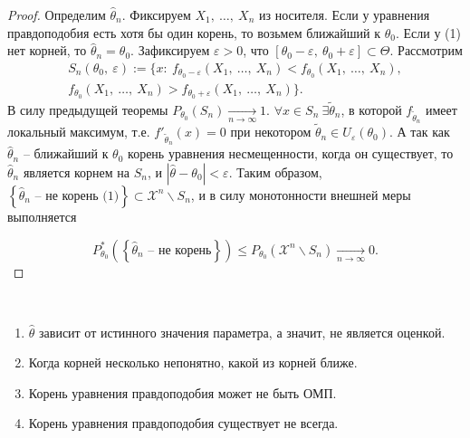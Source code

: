 \begin{proof}
    Определим $\displaystyle \hat{\theta }_{n}$. Фиксируем $\displaystyle X_{1} ,\ \dotsc ,\ X_{n}$ из носителя. Если у уравнения правдоподобия есть хотя бы один корень, то возьмем ближайший к $\displaystyle \theta _{0}$. Если у (1) нет корней, то $\displaystyle \hat{\theta }_{n} =\theta _{0}$. Зафиксируем $\displaystyle \varepsilon  >0$, что $\displaystyle [ \theta _{0} -\varepsilon ,\ \theta _{0} +\varepsilon ] \subset \Theta $. Рассмотрим
    \begin{gather*}
        S_{n}( \theta _{0} ,\ \varepsilon ) :=\{x:\ f_{\theta _{0} -\varepsilon }( X_{1} ,\ \dotsc ,\ X_{n}) < f_{\theta _{0}}( X_{1} ,\ \dotsc ,\ X_{n}) ,\\
        f_{\theta _{0}}( X_{1} ,\ \dotsc ,\ X_{n})  >f_{\theta _{0} +\varepsilon }( X_{1} ,\ \dotsc ,\ X_{n})\} .
    \end{gather*}
    В силу предыдущей теоремы $\displaystyle P_{\theta _{0}}( S_{n})\xrightarrow[n\rightarrow \infty ]{} 1$. $\displaystyle \forall x\in S_{n} \ \exists \tilde{\theta }_{n}$, в которой $\displaystyle f_{\tilde{\theta}_n}$ имеет локальный максимум, т.е. $\displaystyle f'_{\tilde{\theta }_{n}}\left(x\right) =0$ при некотором $\displaystyle \tilde{\theta }_n \in U_{\varepsilon }( \theta _{0})$. А так как $\displaystyle \hat{\theta }_{n}$ -- ближайший к $\displaystyle \theta _{0}$ корень уравнения несмещенности, когда он существует, то $\displaystyle \hat{\theta }_{n}$ является корнем на $\displaystyle S_{n}$, и $\displaystyle | \hat{\theta } -\theta _{0}| < \varepsilon $. Таким образом, $\displaystyle \left\{\hat{\theta }_{n}\text{ -- не корень (1)}\right\} \subset \mathcal{X}^{n} \backslash S_{n}$, и в силу монотонности внешней меры выполняется
    
    
    \begin{equation*}
        P_{\theta _{0}}^{*}\left(\left\{\hat{\theta }_{n}\text{ -- не корень}\right\}\right) \leqslant P_{\theta _{0}}\left(\mathcal{X}^{n} \backslash S_{n}\right)\xrightarrow[n\rightarrow \infty ]{} 0.
    \end{equation*}
\end{proof}
\begin{note} ~
    \begin{enumerate}
        \item $\displaystyle \hat{\theta }$ зависит от истинного значения параметра, а значит, не является оценкой.

        \item Когда корней несколько непонятно, какой из корней ближе.
        
        \item Корень уравнения правдоподобия может не быть ОМП.
        
        \item Корень уравнения правдоподобия существует не всегда.
    \end{enumerate}

\end{note}